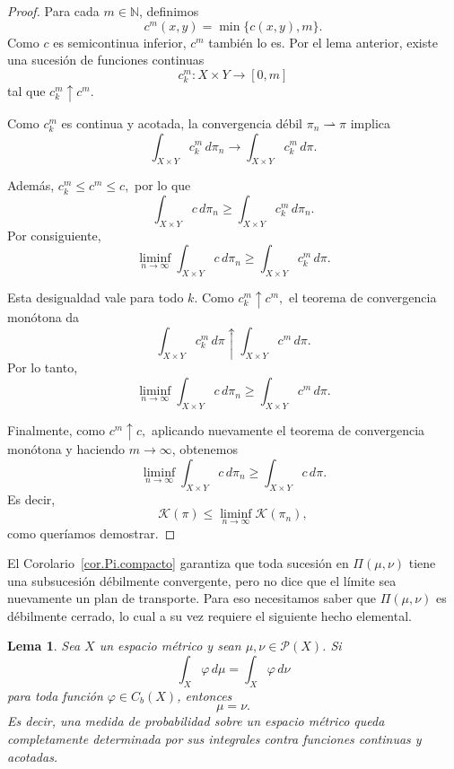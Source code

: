 \documentclass[12pt, a4paper]{amsbook}
\newtheorem{lema}[teo]{Lema}
\theoremstyle{remark}
\theoremstyle{definition}
\numberwithin{section}{chapter}
\numberwithin{subsection}{section}
\numberwithin{equation}{section}
\numberwithin{figure}{chapter}
\begin{document}
\begin{proof}
Para cada \(m\in\mathbb N\), definimos
\[
c^m(x,y)=\min\{c(x,y),m\}.
\]
Como \(c\) es semicontinua inferior, \(c^m\) también lo es. Por el lema
anterior, existe una sucesión de funciones continuas
\[
c^m_k\colon X\times Y\longrightarrow[0,m]
\]
tal que
\(
c^m_k\uparrow c^m.
\)

Como \(c^m_k\) es continua y acotada, la convergencia débil
\(
\pi_n\rightharpoonup\pi
\)
implica
\[
\int_{X\times Y}c^m_k\,d\pi_n
\longrightarrow
\int_{X\times Y}c^m_k\,d\pi.
\]

Además,
\(
c^m_k\leq c^m\leq c,
\)
por lo que
\[
\int_{X\times Y}c\,d\pi_n
\geq
\int_{X\times Y}c^m_k\,d\pi_n.
\]
Por consiguiente,
\[
\liminf_{n\to\infty}
\int_{X\times Y}c\,d\pi_n
\geq
\int_{X\times Y}c^m_k\,d\pi.
\]

Esta desigualdad vale para todo \(k\). Como
\(
c^m_k\uparrow c^m,
\)
el teorema de convergencia monótona da
\[
\int_{X\times Y}c^m_k\,d\pi
\uparrow
\int_{X\times Y}c^m\,d\pi.
\]
Por lo tanto,
\[
\liminf_{n\to\infty}
\int_{X\times Y}c\,d\pi_n
\geq
\int_{X\times Y}c^m\,d\pi.
\]

Finalmente, como
\(
c^m\uparrow c,
\)
aplicando nuevamente el teorema de convergencia monótona y haciendo
\(m\to\infty\), obtenemos
\[
\liminf_{n\to\infty}
\int_{X\times Y}c\,d\pi_n
\geq
\int_{X\times Y}c\,d\pi.
\]
Es decir,
\[
\mathcal K(\pi)
\leq
\liminf_{n\to\infty}\mathcal K(\pi_n),
\]
como queríamos demostrar.
\end{proof}


El Corolario~\ref{cor.Pi.compacto} garantiza que toda sucesión en
$\Pi(\mu,\nu)$ tiene una subsucesión débilmente convergente, pero no dice
que el límite sea nuevamente un plan de transporte. Para eso necesitamos
saber que $\Pi(\mu,\nu)$ es débilmente cerrado, lo cual a su vez requiere el
siguiente hecho elemental.

\begin{lema}\label{lem.medidas}
Sea $X$ un espacio métrico y sean $\mu,\nu\in\mathcal P(X)$.
Si
\[
\int_X\varphi\,d\mu
=
\int_X\varphi\,d\nu
\]
para toda función $\varphi\in C_b(X)$, entonces
\[
\mu=\nu.
\]
Es decir, una medida de probabilidad sobre un espacio métrico queda
completamente determinada por sus integrales contra funciones continuas
y acotadas.
\end{lema}
\end{document}

